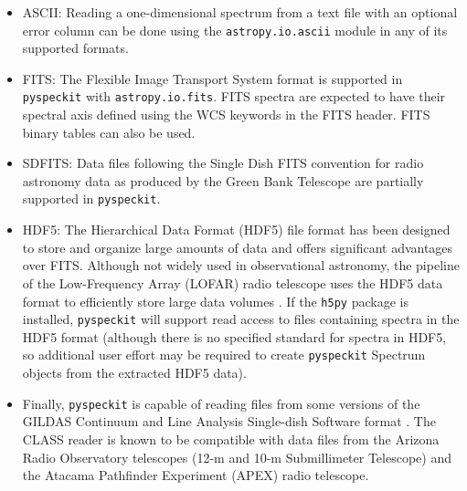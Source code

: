 \documentclass[twocolumn]{aastex62}
\newcommand{\pyspeckit}{\texttt{pyspeckit}\xspace}
\begin{document}
\begin{itemize}
    \item ASCII: Reading a one-dimensional spectrum from a text file with an optional
        error column can
	be done using the \texttt{astropy.io.ascii} module in any of its supported
	formats.
    \item FITS: The Flexible Image Transport System \citep[FITS;][]{Wells1981a,Greisen2006a,Pence2010a} format is
	supported in \pyspeckit with \texttt{astropy.io.fits}.  
    FITS spectra are expected to have their spectral axis defined using the WCS
    keywords in the FITS header.  FITS binary tables can also be used.
    \item SDFITS: Data files following the Single
	Dish FITS \citep[SDFITS;][]{Garwood2000a} convention for radio astronomy data as
	produced by the Green Bank Telescope are partially supported in \pyspeckit.
    \item HDF5: The Hierarchical Data Format (HDF5) file format has been
        designed to store and organize large amounts of data and offers
        significant advantages over FITS\@.  Although not widely used in
        observational astronomy, the pipeline of the Low-Frequency Array
        (LOFAR) radio telescope uses the HDF5 data format to efficiently store
        large data volumes \citep{Alexov2012a}.  If the \texttt{h5py} package
        is installed, \pyspeckit will support read access to files containing
        spectra in the HDF5 format (although there is no specified standard for
        spectra in HDF5, so additional user effort may be required to create
        \pyspeckit Spectrum objects from the extracted HDF5 data).
    \item Finally, \pyspeckit is capable of reading files from some versions of
        the GILDAS Continuum and Line Analysis Single-dish Software format
        \citep[CLASS;][]{Gildas-Team2013a}.  
        The CLASS reader is known to be compatible with data files from
        the Arizona Radio Observatory telescopes (12-m and 10-m Submillimeter
        Telescope) and the Atacama Pathfinder Experiment (APEX) radio
        telescope.
\end{itemize}
\end{document}
